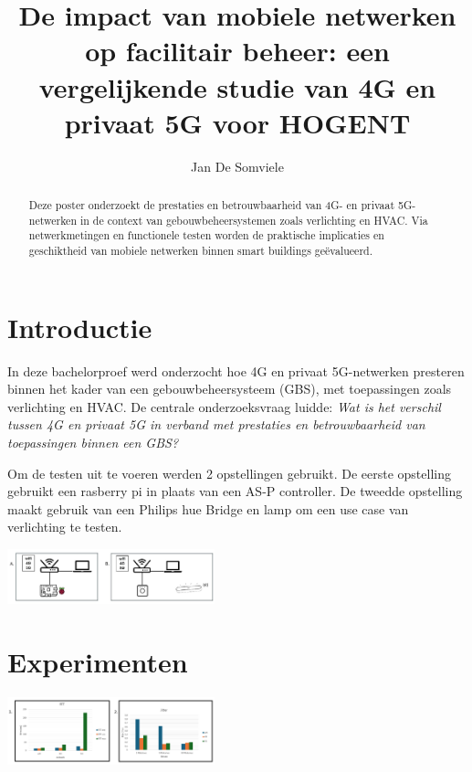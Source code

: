 \documentclass[a0,portrait]{hogent-poster}
\title{De impact van mobiele netwerken op facilitair beheer: een vergelijkende studie van 4G en privaat 5G voor HOGENT}
\author{Jan De Somviele}
\begin{document}
\maketitle

\begin{abstract}
Deze poster onderzoekt de prestaties en betrouwbaarheid van 4G- en privaat 5G-netwerken in de context van gebouwbeheersystemen zoals verlichting en HVAC. Via netwerkmetingen en functionele testen worden de praktische implicaties en geschiktheid van mobiele netwerken binnen smart buildings geëvalueerd.
\end{abstract}

\begin{multicols}{2} %

\section{Introductie}

In deze bachelorproef werd onderzocht hoe 4G en privaat 5G-netwerken presteren binnen het kader van een gebouwbeheersysteem (GBS), met toepassingen zoals verlichting en HVAC. De centrale onderzoeksvraag luidde: \textit{Wat is het verschil tussen 4G en privaat 5G in verband met prestaties en betrouwbaarheid van toepassingen binnen een GBS?}

Om de testen uit te voeren werden 2 opstellingen gebruikt. De eerste opstelling gebruikt een rasberry pi in plaats van een AS-P controller. De tweedde opstelling maakt gebruik van een Philips hue Bridge en lamp om een use case van verlichting te testen. %

\begin{center}
    \captionsetup{type=figure}
    \includegraphics[width=0.45\textwidth]{../graphics/beideOpstellingen.jpg}
\end{center}

\section{Experimenten}

\begin{center}
    \captionsetup{type=figure}
    \includegraphics[width=0.45\textwidth]{../graphics/Latency-Jitter-grafiek.png}
\end{center}


\end{multicols}
\end{document}
